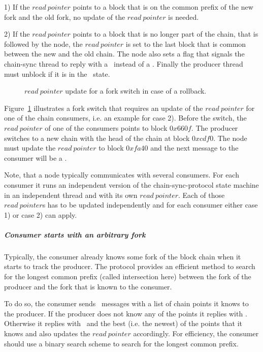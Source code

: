 \documentclass{report}
\theoremstyle{definition}{
  \newtheorem{lemma}{Lemma}[section] %
  \newtheorem{definition}[lemma]{Definition}
}
\theoremstyle{theorem}{
  \newtheorem{invariant}[lemma]{Invariant}
  \newtheorem{proofobligation}[lemma]{Proof Obligation}
}
\numberwithin{equation}{lemma}
\begin{document}
1) If the $read~pointer$ points to a block that is on the common prefix of the new
fork and the old fork, no update of the $read~pointer$ is needed.

2) If the $read~pointer$ points to a block that is no longer part of the chain,
that is followed by the node,
the $read~pointer$ is set to the last block that is common between the new and the old chain.
The node also sets a flag that signals the chain-sync thread to reply with a \RollBackward~instead
of a \RollForward.
Finally the producer thread must unblock if it is in the \MustReply~state.

\begin{figure}[h]
\begin{center}
\end{center}
\caption{$read~pointer$ update for a fork switch in case of a rollback.}
\label{read-pointer-rollback}
\end{figure}

Figure~\ref{read-pointer-rollback} illustrates a fork switch that requires an update of the $read~pointer$
for one of the chain consumers, i.e. an example for case 2).
Before the switch, the $read~pointer$ of one of the consumers points to block $0x660f$.
The producer switches to a new chain with the head of the chain at block $0xcdf0$.
The node must update the $read~pointer$ to block $0xfa40$ and the next message to the consumer will be a \RollBackward.

Note, that a node typically communicates with several consumers. For each consumer it runs an independent
version of the chain-sync-protocol state machine in an independent thread and with its own $read~pointer$.
Each of those $read~pointer$s has to be updated independently and for each consumer
either case 1) or case 2) can apply.

\subparagraph{Consumer starts with an arbitrary fork}
Typically, the consumer already knows some fork of the block chain when it
starts to track the producer.
The protocol provides an efficient method to search for the longest common prefix (called intersection here)
between the fork of the producer and the fork that is known to the consumer.

To do so, the consumer sends \FindIntersect~messages with a list of chain points it knows to the producer.
If the producer does not know any of the points it replies with \IntersectUnchanged.
Otherwise it replies with \IntersectImproved~and the best (i.e. the newest) of the points that it knows
and also updates the $read~pointer$ accordingly.
For efficiency, the consumer should use a binary search scheme to search for the longest common
prefix.
\end{document}
